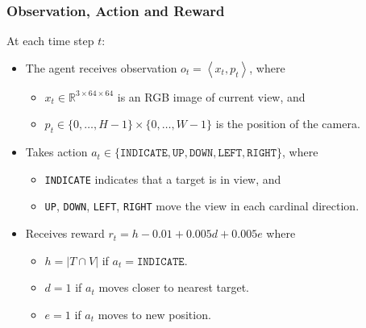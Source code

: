 \begin{frame}
    \frametitle{Observation, Action and Reward}

    At each time step \(t\):

    \begin{itemize}
        \item The agent receives observation \(o_t = \left\langle x_t, p_t \right\rangle\), where
        \begin{itemize}
            \item \(x_t \in \mathbb{R}^{3 \times 64 \times 64}\) is an RGB image of current view, and
            \item \(p_t \in \{0, \dots, H-1\} \times \{0, \dots, W-1\}\) is the position of the camera.
        \end{itemize}
        \item Takes action \(a_t \in \{\texttt{INDICATE}, \texttt{UP}, \texttt{DOWN}, \texttt{LEFT}, \texttt{RIGHT}\}\), where
        \begin{itemize}
            \item \texttt{INDICATE} indicates that a target is in view, and
            \item \texttt{UP}, \texttt{DOWN}, \texttt{LEFT}, \texttt{RIGHT} move the view in each cardinal direction.
        \end{itemize}
        \item Receives reward \(r_t = h - 0.01 + 0.005d + 0.005e\) where
        \begin{itemize}
            \item \(h = \left\vert T \cap V \right\vert\) if \(a_t = \texttt{INDICATE}\).
            \item \(d = 1\) if \(a_t\) moves closer to nearest target.
            \item \(e = 1\) if \(a_t\) moves to new position.
        \end{itemize}
    \end{itemize}
\end{frame}

